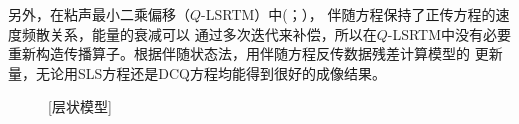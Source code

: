 另外，在粘声最小二乘偏移（$Q$-LSRTM）中(；），
伴随方程保持了正传方程的速度频散关系，能量的衰减可以
通过多次迭代来补偿，所以在$Q$-LSRTM中没有必要重新构造传播算子。根据伴随状态法，用伴随方程反传数据残差计算模型的
更新量，无论用SLS方程还是DCQ方程均能得到很好的成像结果。
\begin{figure}[!htbp]
	    \centering
		\label{fig:lens_v}
\end{figure}
